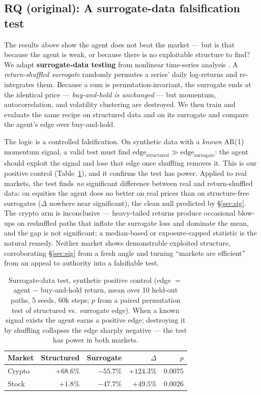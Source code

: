 \documentclass[10pt,twocolumn]{article}
\newcommand{\pc}{\%}  %
\begin{document}
\subsection{RQ (original): A surrogate-data falsification test}
\label{sec:surrogate}
The results above show the agent does not beat the market --- but is that because
the agent is weak, or because there is no exploitable structure to find? We adapt
\textbf{surrogate-data testing} from nonlinear time-series analysis
\cite{theiler1992}. A \emph{return-shuffled surrogate} randomly permutes a series'
daily log-returns and re-integrates them. Because a sum is permutation-invariant,
the surrogate ends at the identical price --- \emph{buy-and-hold is unchanged} ---
but momentum, autocorrelation, and volatility clustering are destroyed. We then
train and evaluate the same recipe on structured data and on its surrogate and
compare the agent's edge over buy-and-hold.

The logic is a controlled falsification. On synthetic data with a \emph{known}
AR(1) momentum signal, a valid test must find $\text{edge}_{\text{structured}} \gg
\text{edge}_{\text{surrogate}}$: the agent should exploit the signal and lose that
edge once shuffling removes it. This is our positive control
(Table~\ref{tab:surrogate}), and it confirms the test has power. Applied to real
markets, the test finds \emph{no} significant difference between real and
return-shuffled data: on equities the agent does no better on real prices than on
structure-free surrogates ($\Delta$ nowhere near significant), the clean
null predicted by \S\ref{sec:sig}. The crypto arm is inconclusive --- heavy-tailed
returns produce occasional blow-ups on reshuffled paths that inflate the surrogate
loss and dominate the mean, and the gap is not significant; a median-based or
exposure-capped
statistic is the natural remedy. Neither market shows demonstrable exploited
structure, corroborating \S\ref{sec:sig} from a fresh angle and turning ``markets
are efficient'' from an appeal to authority into a falsifiable test.

\begin{table}[t]\centering\small
\caption{Surrogate-data test, synthetic positive control (edge $=$ agent $-$
buy-and-hold return, mean over 10 held-out paths, 5 seeds, 60k steps; $p$ from a
paired permutation test of structured vs.\ surrogate edge). When a known signal
exists the agent earns a positive edge; destroying it by shuffling collapses the
edge sharply negative --- the test has power in both markets.}
\label{tab:surrogate}
\begin{tabular}{@{}lrrrr@{}}
\toprule
Market & Structured & Surrogate & $\Delta$ & $p$\\
\midrule
Crypto & $+68.6\pc$ & $-55.7\pc$ & $+124.3\pc$ & $0.0075$\\
Stock  & $+1.8\pc$ & $-47.7\pc$ & $+49.5\pc$ & $0.0026$\\
\bottomrule
\end{tabular}
\end{table}
\end{document}
